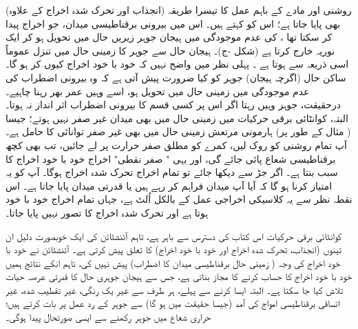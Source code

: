 (انجذاب اور تحرک شدہ  اخراج کے  علاوہ)  روشنی اور مادے کے  باہم عمل کا  تیسرا طریقہ بھی پایا جاتا ہے؛ اس کو   کہتے ہیں۔ اس میں  بیرونی برقناطیسی میدان،  جو اخراج پیدا کر سکتا تھا ،  کی عدم موجودگی میں ہیجان جوہر زیریں حال میں تحویل  ہو کر ایک نوریہ خارج کرتا ہے  (شکل -ج)۔ 	ہیجان حال سے   جوہر کا زمینی حال میں تنزل عموماً اسی ذریعہ  سے ہوتا ہے ۔ پہلی نظر میں  واضح  نہیں کہ خود با خود اخراج کیوں کر ہو گا۔  ساکن حال  (اگرچہ ہیجان)  جوہر کو کیا ضرورت پیش آتی ہے کہ وہ بیرونی اضطراب کی عدم موجودگی میں زمینی حال میں   تحویل  ہو، اسے وہیں عمر بھر رہنا چاہیے۔ درحقیقت،  جوہر وہیں رہتا اگر اس پر کسی قسم کا بیرونی اضطراب اثر انداز نہ ہوتا۔ البتہ،   کوانٹائی برقی حرکیات میں زمینی حال میں بھی میدان غیر صفر نہیں  ہوتے؛  جیسا ( مثال کے طور پر)   ہارمونی مرتعش زمینی حال میں بھی غیر صفر توانائی  کا حامل ہے۔ آپ تمام روشنی کو روک لیں،  کمرے  کو مطلق صفر حرارت پر لے جائیں، تب بھی کچھ  برقناطیسی شعاع پائی جائے گی، اور یہی " صفر نقطی"  اخراج خود با خود اخراج کا سبب بنتا ہے۔ اگر جڑ سے دیکھا جائے تو  تمام اخراج تحرک شدہ اخراج ہوگا۔ آپ کو یہ امتیاز کرنا ہو گا کہ آیا آپ  میدان  فراہم کر رہے ہیں  یا قدرتی میدان پایا جاتا ہے۔ اس نقطہ نظر سے یہ کلاسیکی اخراجی عمل کے بالکل اُلٹ ہے، جہاں تمام اخراج خود با خود ہوتا ہے اور تحرک شدہ اخراج کا تصور نہیں پایا جاتا۔

کوانٹائی برقی حرکیات اس کتاب کی   دسترس  سے باہر ہے،  تاہم آئنشٹائن کی ایک خوبصورت دلیل ان تینوں (انجذاب،   تحرک شدہ اخراج اور خود با خود اخراج)  کا تعلق پیش کرتی ہے۔ آئنشٹائن نے خود با خود اخراج کی وجہ ( زمینی حال برقناطیسی میدان کا اضطراب)  پیش نہیں کی،  تاہم انکے نتائج ہمیں خود با خود اخراج کا حساب کرنے کا مجاز بناتی ہے، جس سے ہیجان جوہری حال کا  قدرتی عرصہ حیات تلاش کیا جا سکتا ہے۔ البتہ   ایسا کرنے سے پہلے، ہر طرف سے غیر یک رنگی، غیر تقطیب شدہ، غیر اتساقی  برقناطیسی امواج کی آمد  (جیسا حقیقت میں ہو گا) سے جوہر کے رد عمل پر بات کرتے ہیں؛  حراری شعاع میں جوہر رکھنے سے ایسی صورتحال پیدا ہوگی۔


